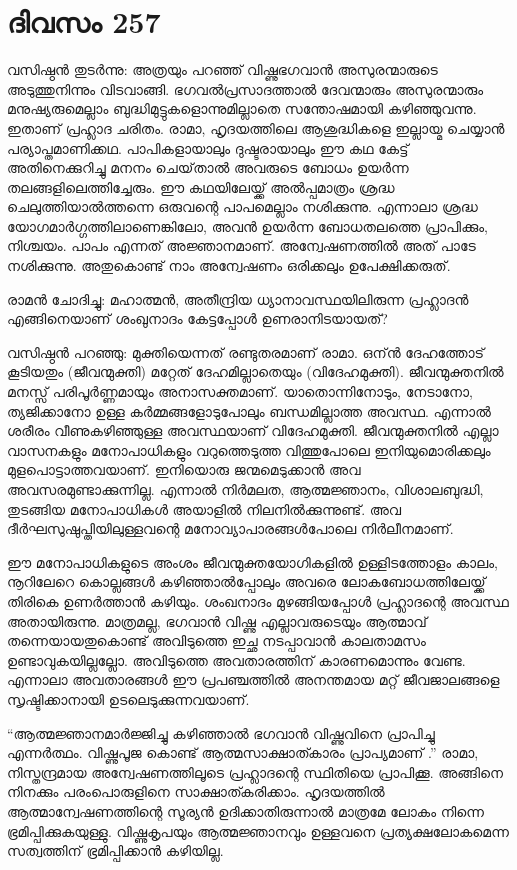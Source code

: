 \section{ദിവസം 257}


വസിഷ്ഠന്‍ തുടര്‍ന്നു: അത്രയും പറഞ്ഞ് വിഷ്ണുഭഗവാന്‍ അസുരന്മാരുടെ അടുത്തുനിന്നും വിടവാങ്ങി. ഭഗവല്‍പ്രസാദത്താല്‍ ദേവന്മാരും അസുരന്മാരും മനുഷ്യരുമെല്ലാം ബുദ്ധിമുട്ടുകളൊന്നുമില്ലാതെ സന്തോഷമായി കഴിഞ്ഞുവന്നു. ഇതാണ് പ്രഹ്ലാദ ചരിതം. രാമാ, ഹൃദയത്തിലെ ആശുദ്ധികളെ ഇല്ലായ്മ ചെയ്യാന്‍ പര്യാപ്തമാണിക്കഥ. പാപികളായാലും ദുഷ്ടരായാലും ഈ കഥ കേട്ട് അതിനെക്കുറിച്ചു മനനം ചെയ്‌താല്‍ അവരുടെ ബോധം ഉയര്‍ന്ന തലങ്ങളിലെത്തിച്ചേരും. ഈ കഥയിലേയ്ക്ക് അല്‍പ്പമാത്രം ശ്രദ്ധ ചെലുത്തിയാല്‍ത്തന്നെ ഒരുവന്റെ പാപമെല്ലാം നശിക്കുന്നു. എന്നാലാ ശ്രദ്ധ യോഗമാര്‍ഗ്ഗത്തിലാണെങ്കിലോ, അവന്‍ ഉയര്‍ന്ന ബോധതലത്തെ പ്രാപിക്കും, നിശ്ചയം. പാപം എന്നത് അജ്ഞാനമാണ്. അന്വേഷണത്തില്‍ അത് പാടേ നശിക്കുന്നു. അതുകൊണ്ട് നാം അന്വേഷണം ഒരിക്കലും ഉപേക്ഷിക്കരുത്.

രാമന്‍ ചോദിച്ചു: മഹാത്മന്‍, അതീന്ദ്രിയ ധ്യാനാവസ്ഥയിലിരുന്ന പ്രഹ്ലാദന്‍ എങ്ങിനെയാണ് ശംഖുനാദം കേട്ടപ്പോള്‍ ഉണരാനിടയായത്?

വസിഷ്ഠന്‍ പറഞ്ഞു: മുക്തിയെന്നത് രണ്ടുതരമാണ് രാമാ. ഒന്ന്‍ ദേഹത്തോട് കൂടിയതും (ജീവന്മുക്തി) മറ്റേത് ദേഹമില്ലാതെയും (വിദേഹമുക്തി). ജീവന്മുക്തനില്‍ മനസ്സ് പരിപൂര്‍ണ്ണമായും അനാസക്തമാണ്. യാതൊന്നിനോടും, നേടാനോ, ത്യജിക്കാനോ ഉള്ള കര്‍മ്മങ്ങളോടുപോലും ബന്ധമില്ലാത്ത അവസ്ഥ. എന്നാല്‍ ശരീരം വീണുകഴിഞ്ഞുള്ള അവസ്ഥയാണ് വിദേഹമുക്തി. ജീവന്മുക്തനില്‍ എല്ലാ വാസനകളും മനോപാധികളും വറുത്തെടുത്ത വിത്തുപോലെ ഇനിയുമൊരിക്കലും മുളപൊട്ടാത്തവയാണ്. ഇനിയൊരു ജന്മമെടുക്കാന്‍ അവ അവസരമുണ്ടാക്കുന്നില്ല. എന്നാല്‍ നിര്‍മലത, ആത്മജ്ഞാനം, വിശാലബുദ്ധി, തുടങ്ങിയ മനോപാധികള്‍ അയാളില്‍ നിലനില്‍ക്കുന്നുണ്ട്. അവ ദീര്‍ഘസുഷുപ്തിയിലുള്ളവന്റെ മനോവ്യാപാരങ്ങള്‍പോലെ നിര്‍ലീനമാണ്.      

ഈ മനോപാധികളുടെ അംശം ജീവന്മുക്തയോഗികളില്‍ ഉള്ളിടത്തോളം കാലം, നൂറിലേറെ കൊല്ലങ്ങള്‍ കഴിഞ്ഞാല്‍പ്പോലും  അവരെ ലോകബോധത്തിലേയ്ക്ക് തിരികെ ഉണര്‍ത്താന്‍ കഴിയും. ശംഖനാദം മുഴങ്ങിയപ്പോള്‍  പ്രഹ്ലാദന്റെ അവസ്ഥ അതായിരുന്നു. മാത്രമല്ല, ഭഗവാന്‍ വിഷ്ണു എല്ലാവരുടെയും ആത്മാവ് തന്നെയായതുകൊണ്ട് അവിടുത്തെ ഇച്ഛ നടപ്പാവാന്‍ കാലതാമസം ഉണ്ടാവുകയില്ലല്ലോ. അവിടുത്തെ അവതാരത്തിന് കാരണമൊന്നും വേണ്ട. എന്നാലാ അവതാരങ്ങള്‍ ഈ പ്രപഞ്ചത്തില്‍ അനന്തമായ മറ്റ്‌ ജീവജാലങ്ങളെ സൃഷ്ടിക്കാനായി ഉടലെടുക്കുന്നവയാണ്.     

“ആത്മജ്ഞാനമാര്‍ജ്ജിച്ചു കഴിഞ്ഞാല്‍ ഭഗവാന്‍ വിഷ്ണുവിനെ പ്രാപിച്ചു എന്നര്‍ത്ഥം. വിഷ്ണുപൂജ കൊണ്ട് ആത്മസാക്ഷാത്കാരം പ്രാപ്യമാണ് .” രാമാ, നിസ്തന്ദ്രമായ അന്വേഷണത്തിലൂടെ പ്രഹ്ലാദന്റെ സ്ഥിതിയെ പ്രാപിക്കൂ. അങ്ങിനെ നിനക്കും പരംപൊരുളിനെ സാക്ഷാത്കരിക്കാം. ഹൃദയത്തില്‍ ആത്മാന്വേഷണത്തിന്റെ സൂര്യന്‍ ഉദിക്കാതിരുന്നാല്‍ മാത്രമേ ലോകം നിന്നെ ഭ്രമിപ്പിക്കുകയുള്ളു. വിഷ്ണുകൃപയും ആത്മജ്ഞാനവും ഉള്ളവനെ പ്രത്യക്ഷലോകമെന്ന സത്വത്തിന് ഭ്രമിപ്പിക്കാന്‍ കഴിയില്ല.